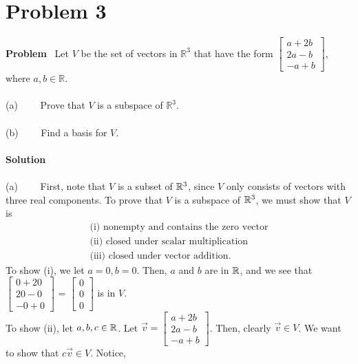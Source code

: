 \section{Problem 3}
\edef\sectionheader{February 16}

\noindent \textbf{Problem} \ Let $V$ be the set of vectors in $\mathbb{R}^3$ that have the form
$\begin{bmatrix}
a+2b \\
2a-b \\
-a+b
\end{bmatrix}$,
where $a,b \in \mathbb{R}$.
\\\\
    \indent (a) \ \ \ \ Prove that $V$ is a subspace of $\mathbb{R}^3$.
\\\\
    \indent (b) \ \ \ \ Find a basis for $V$.
\\\\
\noindent \textbf{Solution}
\\\\
    \indent (a) \ \ \ \ First, note that $V$ is a subset of $\mathbb{R}^3$, since $V$ only consists of vectors with three real components. To prove that $V$ is a subspace of $\mathbb{R}^3$, we must show that $V$ is
    \begin{align*}
        \text{(i) nonempty and contains the zero vector} \\
        \text{(ii) closed under scalar multiplication} \\
        \text{(iii) closed under vector addition}.
    \end{align*}
    To show (i), we let $a=0,b=0$. Then, $a$ and $b$ are in $\mathbb{R}$, and we see that
    $\begin{bmatrix}
        0+20 \\
        20-0 \\
        -0+0
    \end{bmatrix}$
    =
    $\begin{bmatrix}
        0 \\
        0 \\
        0
    \end{bmatrix}$
    is in $V$. \\
    To show (ii), let $a,b,c \in \mathbb{R}$. Let $\vec{v} = 
        \begin{bmatrix}
            a+2b \\
            2a-b \\
            -a+b
        \end{bmatrix}$. Then, clearly $\vec{v} \in V$. We want to show that $c\vec{v} \in V$. Notice,
